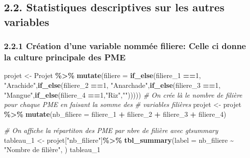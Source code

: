 \documentclass[
]{article}
\newenvironment{Shaded}{\begin{snugshade}}{\end{snugshade}}
\newcommand{\AttributeTok}[1]{\textcolor[rgb]{0.13,0.29,0.53}{#1}}
\newcommand{\CommentTok}[1]{\textcolor[rgb]{0.56,0.35,0.01}{\textit{#1}}}
\newcommand{\DecValTok}[1]{\textcolor[rgb]{0.00,0.00,0.81}{#1}}
\newcommand{\FunctionTok}[1]{\textcolor[rgb]{0.13,0.29,0.53}{\textbf{#1}}}
\newcommand{\NormalTok}[1]{#1}
\newcommand{\OtherTok}[1]{\textcolor[rgb]{0.56,0.35,0.01}{#1}}
\newcommand{\SpecialCharTok}[1]{\textcolor[rgb]{0.81,0.36,0.00}{\textbf{#1}}}
\newcommand{\StringTok}[1]{\textcolor[rgb]{0.31,0.60,0.02}{#1}}
\begin{document}
\hypertarget{statistiques-descriptives-sur-les-autres-variables}{%
\subsection{2.2. Statistiques descriptives sur les autres
variables}\label{statistiques-descriptives-sur-les-autres-variables}}

\hypertarget{cruxe9ation-dune-variable-nommuxe9e-filiere-celle-ci-donne-la-culture-principale-des-pme}{%
\subsubsection{2.2.1 Création d'une variable nommée filiere: Celle ci
donne la culture principale des
PME}\label{cruxe9ation-dune-variable-nommuxe9e-filiere-celle-ci-donne-la-culture-principale-des-pme}}

\begin{Shaded}
\begin{Highlighting}[]
\NormalTok{projet }\OtherTok{\textless{}{-}}\NormalTok{ Projet }\SpecialCharTok{\%\textgreater{}\%} \FunctionTok{mutate}\NormalTok{(}\AttributeTok{filiere =} \FunctionTok{if\_else}\NormalTok{(filiere\_1 }\SpecialCharTok{==}\DecValTok{1}\NormalTok{, }
                  \StringTok{"Arachide"}\NormalTok{,}\FunctionTok{if\_else}\NormalTok{(filiere\_2 }\SpecialCharTok{==}\DecValTok{1}\NormalTok{, }
                  \StringTok{"Anarchade"}\NormalTok{,}\FunctionTok{if\_else}\NormalTok{(filiere\_3 }\SpecialCharTok{==}\DecValTok{1}\NormalTok{, }
                  \StringTok{"Mangue"}\NormalTok{,}\FunctionTok{if\_else}\NormalTok{(filiere\_4 }\SpecialCharTok{==}\DecValTok{1}\NormalTok{,}\StringTok{"Riz"}\NormalTok{,}\StringTok{""}\NormalTok{)))))}
\CommentTok{\# On crée là le nombre de filière pour chaque PME en faisant la somme des }
\CommentTok{\#           variables filières}
\NormalTok{projet }\OtherTok{\textless{}{-}}\NormalTok{ projet }\SpecialCharTok{\%\textgreater{}\%} \FunctionTok{mutate}\NormalTok{(}\AttributeTok{nb\_filiere =}\NormalTok{ filiere\_1 }\SpecialCharTok{+}\NormalTok{ filiere\_2 }\SpecialCharTok{+}\NormalTok{ filiere\_3 }\SpecialCharTok{+}\NormalTok{ filiere\_4)}

\CommentTok{\# On affiche la répartiton des PME par nbre de filière avec gtsummary}
\NormalTok{tableau\_1 }\OtherTok{\textless{}{-}}\NormalTok{ projet[}\StringTok{"nb\_filiere"}\NormalTok{]}\SpecialCharTok{\%\textgreater{}\%}
  \FunctionTok{tbl\_summary}\NormalTok{(}\AttributeTok{label =}\NormalTok{ nb\_filiere }\SpecialCharTok{\textasciitilde{}} \StringTok{"Nombre de filière"}\NormalTok{,}
\NormalTok{  )}
\NormalTok{tableau\_1}
\end{Highlighting}
\end{Shaded}
\end{document}
